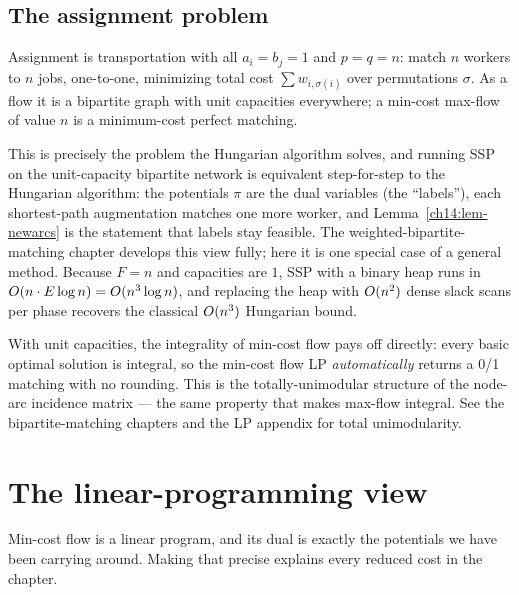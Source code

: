 \subsection{The assignment problem}

Assignment is transportation with all $a_i=b_j=1$ and $p=q=n$: match $n$ workers to $n$ jobs, one-to-one, minimizing total cost $\sum w_{i,\sigma(i)}$ over permutations $\sigma$. As a flow it is a bipartite graph with unit capacities everywhere; a min-cost max-flow of value $n$ is a minimum-cost perfect matching.

\begin{applicationbox}
This is precisely the problem the Hungarian algorithm solves, and running SSP on the unit-capacity bipartite network is equivalent step-for-step to the Hungarian algorithm: the potentials $\pi$ are the dual variables (the ``labels''), each shortest-path augmentation matches one more worker, and Lemma~\ref{ch14:lem-newarcs} is the statement that labels stay feasible. The weighted-bipartite-matching chapter develops this view fully; here it is one special case of a general method. Because $F=n$ and capacities are $1$, SSP with a binary heap runs in $O(n\cdot E\log n)=O(n^3\log n)$, and replacing the heap with $O(n^2)$ dense slack scans per phase recovers the classical $O(n^3)$ Hungarian bound.
\end{applicationbox}

\begin{connectionbox}
With unit capacities, the integrality of min-cost flow pays off directly: every basic optimal solution is integral, so the min-cost flow LP \emph{automatically} returns a 0/1 matching with no rounding. This is the totally-unimodular structure of the node-arc incidence matrix --- the same property that makes max-flow integral. See the bipartite-matching chapters and the LP appendix for total unimodularity.
\end{connectionbox}

\section{The linear-programming view}
\label{ch14:lp}

Min-cost flow is a linear program, and its dual is exactly the potentials we have been carrying around. Making that precise explains every reduced cost in the chapter.


